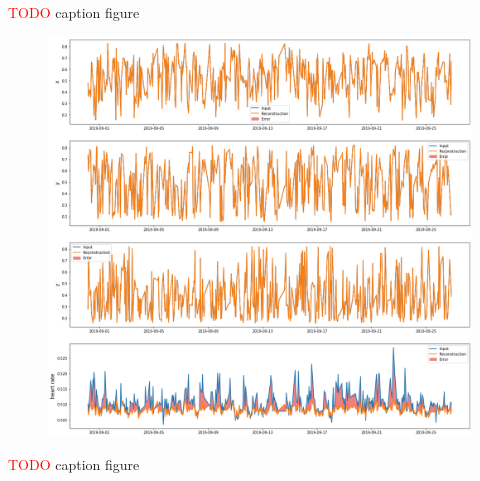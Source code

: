 \textcolor{red}{TODO} caption figure

\begin{figure}[H]
\centering
  \includegraphics[scale=0.35]{img/task_2/reconstructions_test.png}
  \caption{}
  \label{fig: }
\end{figure}

\textcolor{red}{TODO} caption figure
